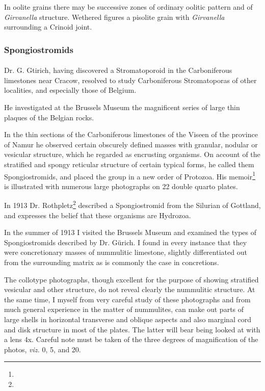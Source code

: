 \documentclass[a4paper, 12pt, oneside]{article}
\begin{document}
In oolite grains there may be successive zones of ordinary oolitic pattern and of \emph{Girvanella} structure. Wethered figures a pisolite grain with \emph{Girvanella} surrounding a Crinoid joint.

\subsubsection{Spongiostromids}
\paragraph{}
Dr. G. Gtirich, having discovered a Stromatoporoid in the Carboniferous limestones near Cracow, resolved to study Carboniferous Stromatoporas of other localities, and especially those of Belgium.

He investigated at the Brussels Museum the magnificent series of large thin plaques of the Belgian rocks.

In the thin sections of the Carboniferous limestones of the Viseen of the province of Namur he observed certain obscurely defined masses with granular, nodular or vesicular structure, which he regarded as encrusting organisms. On account of the stratified and spongy reticular structure of certain typical forms, he called them Spongiostromids, and placed the group in a new order of Protozoa. His memoir\footnote{} is illustrated with numerous large photographs on 22 double quarto plates.

In 1913 Dr. Rothpletz\footnote{} described a Spongiostromid from the Silurian of Gottland, and expresses the belief that these organisms are Hydrozoa.

In the summer of 1913 I visited the Brussels Museum and examined the types of Spongiostromids described by Dr. Gürich. I found in every instance that they were concretionary masses of nummulitic limestone, slightly differentiated out from the surrounding matrix as is commonly the case in concretions.

The collotype photographs, though excellent for the purpose of showing stratified vesicular and other structure, do not reveal clearly the nummulitic structure. At the same time, I myself from very careful study of these photographs and from much general experience in the matter of nummulites, can make out parts of large shells in horizontal transverse and oblique aspects and also marginal cord and disk structure in most of the plates. The latter will bear being looked at with a lens 4x. Careful note must be taken of the three degrees of magnification of the photos, \emph{viz.} 0, 5, and 20.
\end{document}
